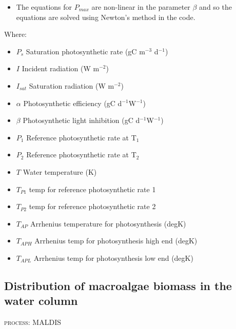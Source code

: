 \documentclass{article}
\begin{document}
\begin{itemize}
\item The equations for $P_{max}$ are non-linear in the parameter $\beta$ and so the equations are solved using Newton's method in the code.
\end{itemize}

Where:

\begin{itemize}
\item $P_s$ Saturation photosynthetic rate (gC m$^{-3}$ d$^{-1}$)
\item $I$ Incident radiation (W m$^{-2}$)
\item $I_{sat}$ Saturation radiation (W m$^{-2}$)
\item $\alpha$ Photosynthetic efficiency (gC d$^{-1}$W$^{-1}$) 
\item $\beta$ Photosynthetic light inhibition (gC d$^{-1}$W$^{-1}$) 
\item $P_1$ Reference photosynthetic rate at T$_1$
\item $P_2$ Reference photosynthetic rate at T$_2$
\item $T$ Water temperature (K)
\item $T_{P1}$ temp for reference photosynthetic rate 1
\item $T_{P2}$ temp for reference photosynthetic rate 2

\item $T_{AP}$ Arrhenius temperature for photosynthesis               (degK)
\item $T_{APH}$ Arrhenius temp for photosynthesis high end             (degK)
\item $T_{APL}$ Arrhenius temp for photosynthesis low end             (degK)

\end{itemize}

\subsection{Distribution of macroalgae biomass in the water column}
\begin{flushright}
\textsc{process: MALDIS}
\end{flushright}
\end{document}

